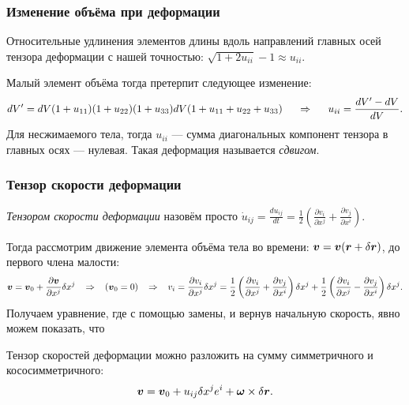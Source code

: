 \subsubsection*{Изменение объёма при деформации}
Относительные удлинения элементов длины вдоль направлений главных осей тензора деформации с нашей точностью: $\sqrt{1 + 2 u_{i i}} - 1 \approx u_{ii}$.

Малый элемент объёма тогда претерпит следующее изменение:
\begin{equation*}
	d V' = d V(1 + u_{1 1})(1 + u_{2 2})(1 + u_{3 3}) d V (1 + u_{1 1} + u_{2 2} + u_{3 3})
	\hspace*{0.5 cm}
	\Rightarrow
	\hspace*{0.5 cm}
	u_{i i} = \frac{d V' - d V}{d V}.
\end{equation*}
Для несжимаемого тела, тогда $u_{i i}$ --- сумма диагональных компонент тензора в главных осях --- нулевая. Такая деформация называется \textit{сдвигом}.

\subsubsection*{Тензор скорости деформации}
\begin{to_def}
	\textit{Тензором скорости деформации}  назовём просто $\dot{u}_{i j} = \frac{d u_{i j} }{ d t} = \frac{1}{2}\left(\frac{\partial v_i}{\partial x^j} + \frac{\partial v_j}{\partial x ^i}\right)$.
\end{to_def}
Тогда рассмотрим движение элемента объёма тела во времени: $\mbox{\boldmath $v$} = \mbox{\boldmath $v$}(\mbox{\boldmath $r$} + \delta \mbox{\boldmath $r$})$, до первого члена малости:
\begin{equation*}
	\mbox{\boldmath $v$} = \mbox{\boldmath $v$}_0 + \frac{\partial \mbox{\boldmath $v$}}{\partial x^j} \delta x^j
	\hspace*{0.3 cm}
	\Rightarrow
	\hspace*{0.3 cm}
	\left(\mbox{\boldmath $v$}_0 = 0\right)
	\hspace*{0.3 cm}
	\Rightarrow
	\hspace*{0.3 cm}
	v_i = \frac{\partial v_i}{\partial x^j} \delta x^j = \frac{1}{2} \left(\frac{\partial v_i}{\partial x^j} + \frac{\partial v_j}{\partial x^i} \right) \delta x^j + \frac{1}{2} \left(\frac{\partial v_i}{\partial x^j} - \frac{\partial v_j}{\partial x^i} \right) \delta x^j.
\end{equation*}
Получаем уравнение, где с помощью замены, и вернув начальную скорость, явно можем показать, что
\begin{to_thr}
	Тензор скоростей деформации можно разложить на сумму симметричного и кососимметричного:
	\begin{equation*}
	 	\mbox{\boldmath $v$} = \mbox{\boldmath $v$}_0 + u_{i j} \delta x^j e^i + \mbox{\boldmath $\omega$} \times \delta \mbox{\boldmath $r$}.
	 \end{equation*} 	
\end{to_thr} 

